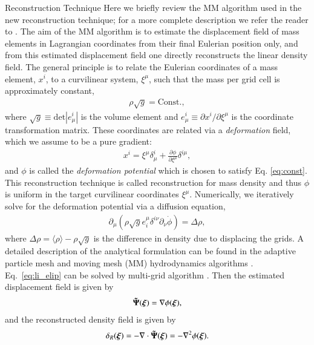 \begin{section}{Reconstruction Technique}
  \label{sec:reconstruction}
  Here we briefly review the MM algorithm used in the new reconstruction technique; for a more
  complete description we refer the reader to \citealt{bib:ZhuH2016}.  
  The aim of the MM algorithm is to estimate the displacement field of mass elements in 
  Lagrangian coordinates from their final Eulerian position only, and from this
  estimated displacement field one directly reconstructs the linear density field. The
  general principle is to relate the Eulerian coordinates of a mass element, $x^i$, to
  a curvilinear system, $\xi^\mu$, such that the mass
  per grid cell is approximately constant,
  \begin{align}
   \label{eq:const}
    \rho \sqrt{g}=\mathrm{Const.},
  \end{align}
  where $\sqrt{g} \equiv \mathrm{det}\left| e^i_\mu\right|$ is the volume
  element and $e^i_\mu \equiv \partial x^i / \partial \xi ^ \mu$ is the coordinate transformation matrix. 
  These coordinates are
  related via a {\it deformation} field, which we assume to be a pure
  gradient:
  \begin{align}
    x^i = \xi^\mu \delta^i_\mu + \frac{\partial \phi}{\partial
    \xi^\mu}\delta^{i\mu},
  \end{align}
  and $\phi$ is called the {\it deformation potential} which is chosen to satisfy Eq. \ref{eq:const}.  
  This reconstruction technique is called  reconstruction for 
  mass density and thus $\phi$ is uniform in the target curvilinear coordinates $\xi^\mu$.
  Numerically, we iteratively solve for
  the deformation potential via a diffusion equation, 
  \begin{align}
    \label{eq:li_elip}
    \partial _\mu (\rho \sqrt{g} e^\mu _i \delta^{i\nu}
    \partial_\nu \dot{\phi})=\Delta \rho,
  \end{align}
  where $\Delta \rho = \langle\rho\rangle-\rho \sqrt{g}$ is the difference in density 
  due to displacing the grids. A detailed description 
  of the analytical formulation can be found in the adaptive
  particle mesh and moving mesh (MM) hydrodynamics algorithms \citep{bib:Pen1995,bib:Pen1998}.
  Eq.~\ref{eq:li_elip} can be solved by multi-grid
  algorithm \citep{bib:Pen1995,bib:Pen1998,bib:ZhuH2016}.
  Then the estimated displacement field is given by
  \begin{align}
   \label{eq:disp}
   \boldsymbol{\tilde{\Psi}}(\boldsymbol{\xi})=\nabla \phi(\boldsymbol{\xi}),
  \end{align}
  and the reconstructed density field is given by
  \begin{align}
   \label{eq:delta}
   \delta_R(\boldsymbol{\xi})=- \nabla \cdot \boldsymbol{\tilde{\Psi}}(\boldsymbol{\xi}) = - \nabla^2 \phi(\boldsymbol{\xi}). 
  \end{align}

\end{section}

